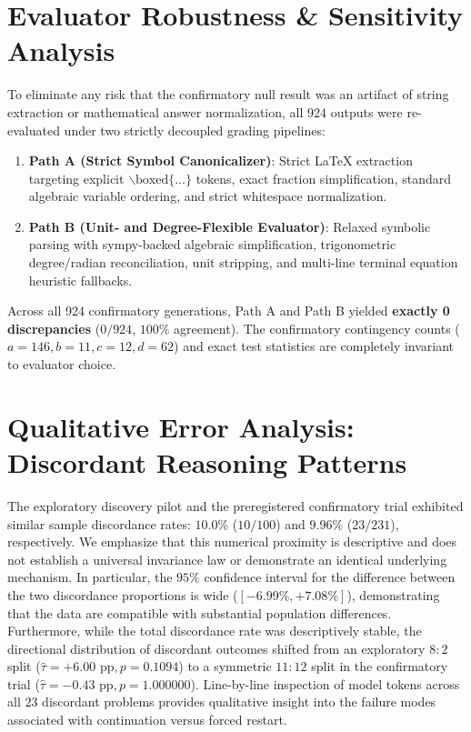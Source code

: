 \documentclass[11pt]{article}
\begin{document}
\section{Evaluator Robustness \& Sensitivity Analysis}
\label{sec:evaluator_sensitivity}

To eliminate any risk that the confirmatory null result was an artifact of string extraction or mathematical answer normalization, all 924 outputs were re-evaluated under two strictly decoupled grading pipelines:
\begin{enumerate}
    \item \textbf{Path A (Strict Symbol Canonicalizer)}: Strict LaTeX extraction targeting explicit $\backslash\text{boxed}\{\dots\}$ tokens, exact fraction simplification, standard algebraic variable ordering, and strict whitespace normalization.
    \item \textbf{Path B (Unit- and Degree-Flexible Evaluator)}: Relaxed symbolic parsing with sympy-backed algebraic simplification, trigonometric degree/radian reconciliation, unit stripping, and multi-line terminal equation heuristic fallbacks.
\end{enumerate}

Across all 924 confirmatory generations, Path A and Path B yielded \textbf{exactly 0 discrepancies} ($0/924$, $100\%$ agreement). The confirmatory contingency counts ($a=146, b=11, c=12, d=62$) and exact test statistics are completely invariant to evaluator choice.

\section{Qualitative Error Analysis: Discordant Reasoning Patterns}
\label{sec:mechanisms}

The exploratory discovery pilot and the preregistered confirmatory trial exhibited similar sample discordance rates: $10.0\%$ ($10/100$) and $9.96\%$ ($23/231$), respectively. We emphasize that this numerical proximity is descriptive and does not establish a universal invariance law or demonstrate an identical underlying mechanism. In particular, the $95\%$ confidence interval for the difference between the two discordance proportions is wide ($[-6.99\%, +7.08\%]$), demonstrating that the data are compatible with substantial population differences. Furthermore, while the total discordance rate was descriptively stable, the directional distribution of discordant outcomes shifted from an exploratory $8:2$ split ($\hat{\tau} = +6.00\text{ pp}, p = 0.1094$) to a symmetric $11:12$ split in the confirmatory trial ($\hat{\tau} = -0.43\text{ pp}, p = 1.000000$). Line-by-line inspection of model tokens across all $23$ discordant problems provides qualitative insight into the failure modes associated with continuation versus forced restart.
\end{document}

